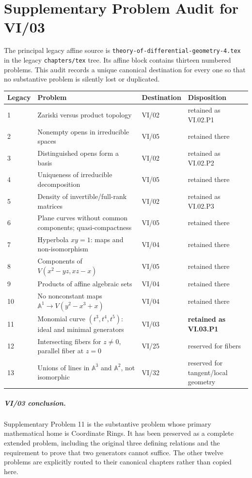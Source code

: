 \chapter*{Supplementary Problem Audit for VI/03}

The principal legacy affine source is \texttt{theory-of-differential-geometry-4.tex} in the legacy \texttt{chapters/tex} tree.
Its affine block contains thirteen numbered problems.  This audit records a unique canonical
destination for every one so that no substantive problem is silently lost or duplicated.

\begin{longtable}{@{}p{}p{}p{}p{}@{}}
\toprule
\textbf{Legacy} & \textbf{Problem} & \textbf{Destination} & \textbf{Disposition}\\
\midrule
1 & Zariski versus product topology & VI/02 & retained as VI.02.P1\\
2 & Nonempty opens in irreducible spaces & VI/05 & retained there\\
3 & Distinguished opens form a basis & VI/02 & retained as VI.02.P2\\
4 & Uniqueness of irreducible decomposition & VI/05 & retained there\\
5 & Density of invertible/full-rank matrices & VI/02 & retained as VI.02.P3\\
6 & Plane curves without common components; quasi-compactness & VI/05 & retained there\\
7 & Hyperbola \(xy=1\): maps and non-isomorphism & VI/04 & retained there\\
8 & Components of \(V(x^2-yz,xz-x)\) & VI/05 & retained there\\
9 & Products of affine algebraic sets & VI/04 & retained there\\
10 & No nonconstant maps \(\mathbb A^1\to V(y^2-x^3+x)\) & VI/04 & retained there\\
11 & Monomial curve \((t^3,t^4,t^5)\): ideal and minimal generators & VI/03 & \textbf{retained as VI.03.P1}\\
12 & Intersecting fibers for \(z\neq0\), parallel fiber at \(z=0\) & VI/25 & reserved for fibers\\
13 & Unions of lines in \(\mathbb A^3\) and \(\mathbb A^2\), not isomorphic & VI/32 & reserved for tangent/local geometry\\
\bottomrule
\end{longtable}

\paragraph{VI/03 conclusion.}
Supplementary Problem 11 is the substantive problem whose primary mathematical home is Coordinate
Rings.  It has been preserved as a complete extended problem, including the original three defining
relations and the requirement to prove that two generators cannot suffice.  The other twelve
problems are explicitly routed to their canonical chapters rather than copied here.
